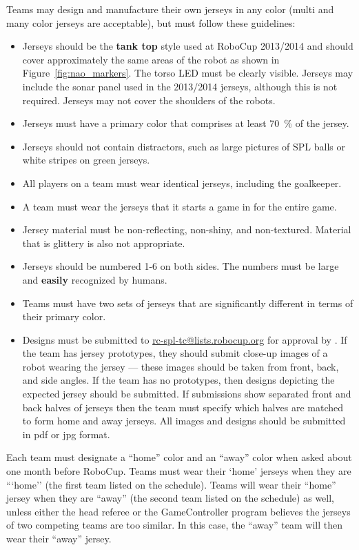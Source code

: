 Teams may design and manufacture their own jerseys in any color (multi and many color jerseys are acceptable), but must follow these guidelines:
\begin{itemize}
\item Jerseys should be the \textbf{tank top} style used at RoboCup 2013/2014 and should cover approximately the same areas of the robot as shown in Figure~\ref{fig:nao_markers}. The torso LED must be clearly visible. Jerseys may include the sonar panel used in the 2013/2014 jerseys, although this is not required. Jerseys may not cover the shoulders of the robots.
\item Jerseys must have a primary color that comprises at least \qty{70}{\percent} of the jersey.
\item Jerseys should not contain distractors, such as large pictures of SPL balls or white stripes on green jerseys.
\item All players on a team must wear identical jerseys, including the goalkeeper.
\item A team must wear the jerseys that it starts a game in for the entire game.
\item Jersey material must be non-reflecting, non-shiny, and non-textured.  Material that is glittery is also not appropriate.
\item Jerseys should be numbered 1-6 on both sides.  The numbers must be large and {\bf easily} recognized by humans.
\item Teams must have two sets of jerseys that are significantly different in terms of their primary color.
\item Designs must be submitted to \url{rc-spl-tc@lists.robocup.org} for approval by . If the team has jersey prototypes, they should submit close-up images of a robot wearing the jersey — these images should be taken from front, back, and side angles.  If the team has no prototypes, then designs depicting the expected jersey should be submitted.  If submissions show separated front and back halves of jerseys then the team must specify which halves are matched to form home and away jerseys.  All images and designs should be submitted in pdf or jpg format.
\end{itemize}

Each team must designate a ``home'' color and an ``away'' color when asked about one month before RoboCup. Teams must wear their `home' jerseys when they are ```home'' (the first team listed on the schedule). Teams will wear their ``home'' jersey when they are ``away'' (the second team listed on the schedule) as well, unless either the head referee or the GameController program believes the jerseys of two competing teams are too similar.  In this case, the ``away'' team will then wear their ``away'' jersey.

